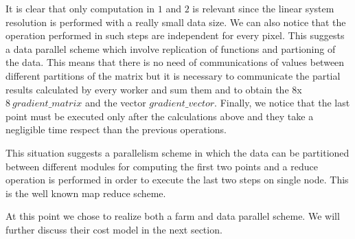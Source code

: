 It is clear that only computation in $1$ and $2$ is relevant since the linear system resolution is performed with a really small data size.
We can also notice that the operation performed in such steps are independent for every pixel.
This suggests a data parallel scheme which involve replication of functions and partioning of the data.
This means that there is no need of communications of values between different partitions of the matrix but it is necessary to communicate the partial results calculated by every worker and sum them and to obtain the $8$x$8\ gradient\_matrix$ and the vector $gradient\_vector$. 
Finally, we notice that the last point must be executed only after the calculations above and they take a negligible time respect than the previous operations.

This situation suggests a parallelism scheme in which the data can be partitioned between different modules for computing the first two points and a reduce operation is performed in order to execute the last two steps on single node. 
This is the well known map reduce scheme.

At this point we chose to realize both a farm and data parallel scheme. We will further discuss their cost model in the next section.